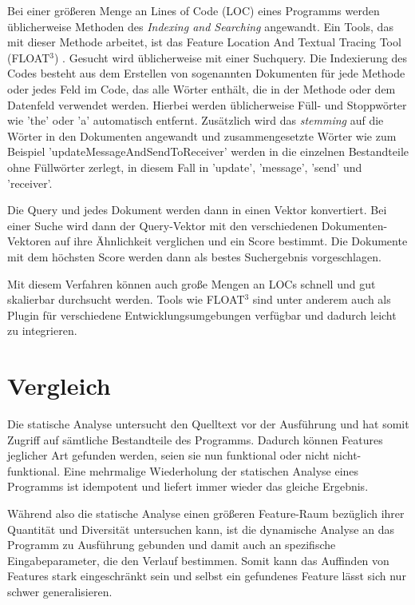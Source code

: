 \documentclass[runningheads,a4paper]{llncs}
\begin{document}
Bei einer größeren Menge an Lines of Code (LOC) eines Programms werden üblicherweise Methoden des \textit{Indexing and Searching} angewandt. Ein Tools, das mit dieser Methode arbeitet, ist das Feature Location And Textual Tracing Tool (FLOAT$^3$) \cite{textual}. Gesucht wird üblicherweise mit einer Suchquery. Die Indexierung des Codes besteht aus dem Erstellen von sogenannten Dokumenten für jede Methode oder jedes Feld im Code, das alle Wörter enthält, die in der Methode oder dem Datenfeld verwendet werden. Hierbei werden üblicherweise Füll- und Stoppwörter wie 'the' oder 'a' automatisch entfernt.
 Zusätzlich wird das \textit{stemming} auf die Wörter in den Dokumenten angewandt und zusammengesetzte Wörter wie zum Beispiel \mbox{'updateMessageAndSendToReceiver'} werden in die einzelnen Bestandteile ohne Füllwörter zerlegt, in diesem Fall in 'update', 'message', 'send' und 'receiver'.
 
 Die Query und jedes Dokument werden dann in einen Vektor konvertiert. Bei einer Suche wird dann der Query-Vektor mit den verschiedenen Dokumenten-Vektoren auf ihre Ähnlichkeit verglichen und ein Score bestimmt. Die Dokumente mit dem höchsten Score werden dann als bestes Suchergebnis vorgeschlagen.
 
Mit diesem Verfahren können auch große Mengen an LOCs schnell und gut skalierbar durchsucht werden. Tools wie FLOAT$^3$ sind unter anderem auch als Plugin für verschiedene Entwicklungsumgebungen verfügbar und dadurch leicht zu integrieren.

\section{Vergleich}

Die statische Analyse untersucht den Quelltext vor der Ausführung und hat somit Zugriff auf sämtliche Bestandteile des Programms. Dadurch können Features jeglicher Art gefunden werden, seien sie nun funktional oder nicht nicht-funktional. Eine mehrmalige Wiederholung der statischen Analyse eines
Programms ist idempotent und liefert immer wieder das gleiche Ergebnis.

Während also die statische Analyse einen größeren Feature-Raum bezüglich ihrer Quantität und Diversität untersuchen kann, ist die dynamische
Analyse an das Programm zu Ausführung gebunden und damit auch an spezifische Eingabeparameter, die den Verlauf bestimmen. Somit kann das Auffinden von Features stark eingeschränkt sein und selbst ein gefundenes Feature lässt sich nur schwer generalisieren.
\end{document}

